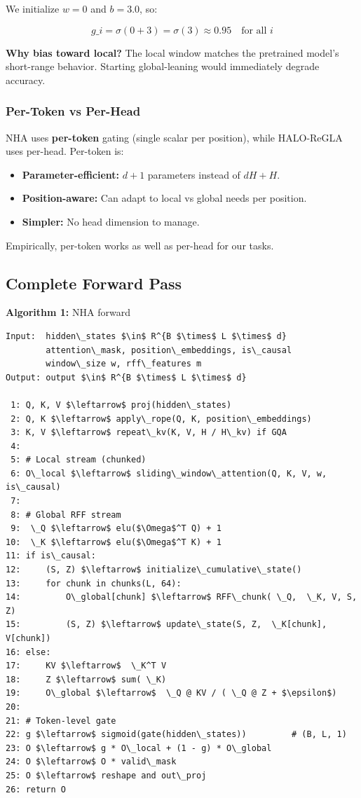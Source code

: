 We initialize $w = 0$ and $b = 3.0$, so:

\[
g\_i = \sigma(0 + 3) = \sigma(3) \approx 0.95 \quad \text{for all } i
\tag{4.12}
\]

\textbf{Why bias toward local?} The local window matches the pretrained model's 
short-range behavior. Starting global-leaning would immediately degrade 
accuracy.

\subsubsection{Per-Token vs Per-Head}

NHA uses \textbf{per-token} gating (single scalar per position), while HALO-ReGLA 
uses per-head. Per-token is:

\begin{itemize}
\item \textbf{Parameter-efficient:} $d + 1$ parameters instead of $d H + H$.
\item \textbf{Position-aware:} Can adapt to local vs global needs per position.
\item \textbf{Simpler:} No head dimension to manage.

\end{itemize}
Empirically, per-token works as well as per-head for our tasks.

\subsection{Complete Forward Pass}

\textbf{Algorithm 1:} NHA forward
\begin{lstlisting}
Input:  hidden\_states $\in$ R^{B $\times$ L $\times$ d}
        attention\_mask, position\_embeddings, is\_causal
        window\_size w, rff\_features m
Output: output $\in$ R^{B $\times$ L $\times$ d}

 1: Q, K, V $\leftarrow$ proj(hidden\_states)
 2: Q, K $\leftarrow$ apply\_rope(Q, K, position\_embeddings)
 3: K, V $\leftarrow$ repeat\_kv(K, V, H / H\_kv) if GQA
 4:
 5: # Local stream (chunked)
 6: O\_local $\leftarrow$ sliding\_window\_attention(Q, K, V, w, is\_causal)
 7:
 8: # Global RFF stream
 9:  \_Q $\leftarrow$ elu($\Omega$^T Q) + 1
10:  \_K $\leftarrow$ elu($\Omega$^T K) + 1
11: if is\_causal:
12:     (S, Z) $\leftarrow$ initialize\_cumulative\_state()
13:     for chunk in chunks(L, 64):
14:         O\_global[chunk] $\leftarrow$ RFF\_chunk( \_Q,  \_K, V, S, Z)
15:         (S, Z) $\leftarrow$ update\_state(S, Z,  \_K[chunk], V[chunk])
16: else:
17:     KV $\leftarrow$  \_K^T V
18:     Z $\leftarrow$ sum( \_K)
19:     O\_global $\leftarrow$  \_Q @ KV / ( \_Q @ Z + $\epsilon$)
20:
21: # Token-level gate
22: g $\leftarrow$ sigmoid(gate(hidden\_states))         # (B, L, 1)
23: O $\leftarrow$ g * O\_local + (1 - g) * O\_global
24: O $\leftarrow$ O * valid\_mask
25: O $\leftarrow$ reshape and out\_proj
26: return O
\end{lstlisting}


